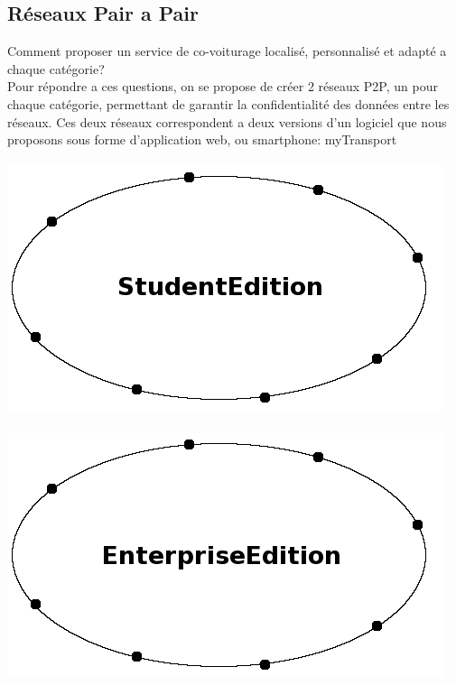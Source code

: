 \subsection{Réseaux Pair a Pair}
Comment proposer un service de co-voiturage localisé, personnalisé et adapté a chaque catégorie?\\
Pour répondre a ces questions, on se propose de créer 2 réseaux P2P, un pour chaque catégorie, permettant de garantir la confidentialité des données entre les réseaux. Ces deux réseaux correspondent a deux versions d'un logiciel que nous proposons sous forme d'application web, ou smartphone: myTransport \\

~~~ \includegraphics[scale=0.35]{img/schema/StudentEdition} ~~~~~~~~~~ \includegraphics[scale=0.35]{img/schema/EnterpriseEdition} \\

